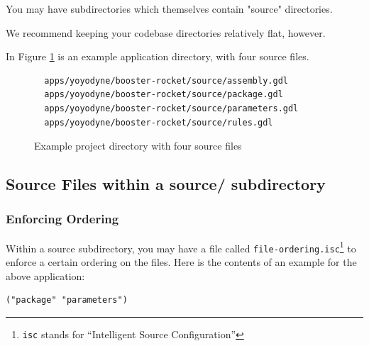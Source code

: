 \documentclass [11pt]{book}
\begin{document}
You may have subdirectories which themselves contain "source"
directories.



We recommend keeping your codebase directories relatively flat,
however.



In Figure 
\ref{fig:yoyodyne-base} is an example application directory, with four source files.


\begin{figure}
\begin{lrbox}{\boxedverb}
\begin{minipage}{\linewidth}

\begin{verbatim}
  apps/yoyodyne/booster-rocket/source/assembly.gdl
  apps/yoyodyne/booster-rocket/source/package.gdl
  apps/yoyodyne/booster-rocket/source/parameters.gdl
  apps/yoyodyne/booster-rocket/source/rules.gdl

\end{verbatim}
\end{minipage}
\end{lrbox}
\fbox{\usebox{\boxedverb}}

\caption{Example project directory with four source files}

\label{fig:yoyodyne-base}

\end{figure}


\subsection{Source Files within a source/ subdirectory}

\label{subsec:sourcefileswithinasource/subdirectory}



\subsubsection{Enforcing Ordering}

\label{subsubsec:enforcingordering}



Within a source subdirectory, you may have a file called \texttt{file-ordering.isc}\footnote{\texttt{isc} stands for ``Intelligent Source Configuration''} to enforce a certain ordering on the files. Here is the contents of an example for the 
above application:



\begin{verbatim}("package" "parameters")
\end{verbatim}
\end{document}
